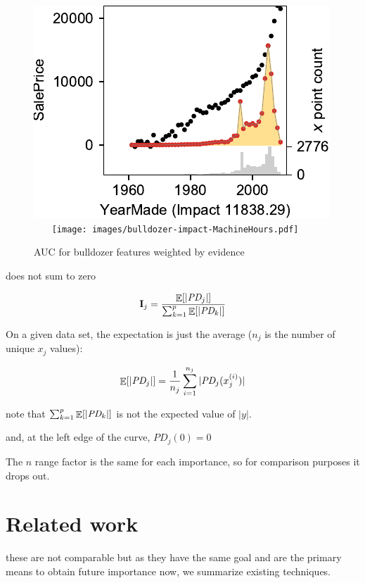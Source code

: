 \documentclass[12pt]{article}
\newcommand{\Ex}{\mathop{\mathbb{E}}}
\newcommand{\Imp}{\mathbf{I}}
\begin{document}
\begin{figure}[htbp]
\begin{center}
\includegraphics[scale=0.6]{images/bulldozer-impact-YearMade.pdf}~~~
\texttt{[image: images/bulldozer-impact-MachineHours.pdf]}
\caption{AUC for bulldozer features weighted by evidence}
\label{fig:bulldozer-impact}
\end{center}
\end{figure}


 does not sum to zero
 
\begin{equation}\label{eq:Epd2}
\Imp_j = \frac{\Ex[|\text{\it PD}_j|]}{\sum_{k=1}^p \Ex[|\text{\it PD}_k|]}
\end{equation}

On a given data set, the expectation is just the average ($n_j$ is the number of unique $x_j$ values):

\begin{equation}\label{eq:Epd}
\Ex[|\text{\it PD}_j|] = \frac{1}{n_j} \sum_{i=1}^{n_j} |\text{\it PD}_j(x_j^{(i)})|
\end{equation}

 note that $\sum_{k=1}^p \Ex[|\text{\it PD}_k|]$ is not the expected value of $|y|$.

 and, at the left edge of the curve, $PD_j(0)=0$
 
\noindent The $n$ range factor is the same for each importance, so for comparison purposes it drops out.  
\section{Related work}

 these are not comparable but as they have the same goal and are the primary means to obtain future importance now, we summarize existing techniques.
\end{document}

